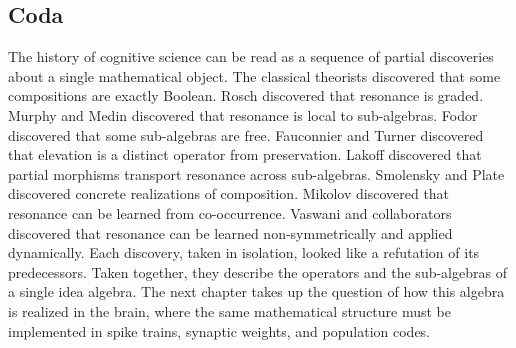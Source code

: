\subsection*{Coda}

The history of cognitive science can be read as a sequence of partial
discoveries about a single mathematical object. The classical theorists
discovered that some compositions are exactly Boolean. Rosch discovered
that resonance is graded. Murphy and Medin discovered that resonance is
local to sub-algebras. Fodor discovered that some sub-algebras are free.
Fauconnier and Turner discovered that elevation is a distinct operator
from preservation. Lakoff discovered that partial morphisms transport
resonance across sub-algebras. Smolensky and Plate discovered concrete
realizations of composition. Mikolov discovered that resonance can be
learned from co-occurrence. Vaswani and collaborators discovered that
resonance can be learned non-symmetrically and applied dynamically.
Each discovery, taken in isolation, looked like a refutation of its
predecessors. Taken together, they describe the operators and the
sub-algebras of a single idea algebra. The next chapter takes up the
question of how this algebra is realized in the brain, where the same
mathematical structure must be implemented in spike trains, synaptic
weights, and population codes.
